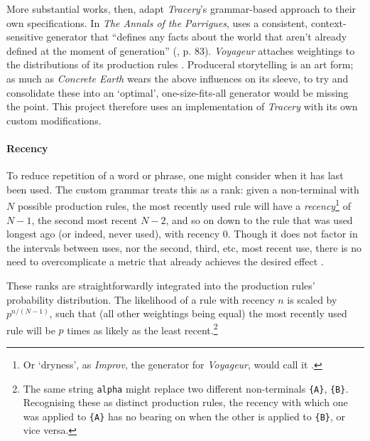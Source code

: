 \documentclass[a4paper, 11pt]{article}
\begin{document}
\begin{flushleft}
\vspace{5pt}\noindent
More substantial works, then, adapt \textit{Tracery}'s grammar-based approach to their own specifications. In \textit{The Annals of the Parrigues}, \citeauthor{shortParrigues} uses a consistent, context-sensitive generator that ``defines any facts about the world that aren’t already defined at the moment of generation'' (\citeyear{shortParrigues}, p. 83). \textit{Voyageur} \citep{diasVoyageur} attaches weightings to the distributions of its production rules \citep{diasVoyageurDescriptions}. Produceral storytelling is an art form; as much as \textit{Concrete Earth} wears the above influences on its sleeve, to try and consolidate these into an `optimal', one-size-fits-all generator would be missing the point. This project therefore uses an implementation of \textit{Tracery} with its own custom modifications.

\paragraph{Recency} To reduce repetition of a word or phrase, one might consider when it has last been used. The custom grammar treats this as a rank: given a non-terminal with $N$ possible production rules, the most recently used rule will have a \textit{recency}\footnote{Or `dryness', as \textit{Improv}, the generator for \textit{Voyageur}, would call it \citep{diasVoyageurDescriptions}.} of $N-1$, the second most recent $N-2$, and so on down to the rule that was used longest ago (or indeed, never used), with recency $0$. Though it does not factor in the intervals between uses, nor the second, third, etc, most recent use, there is no need to overcomplicate a metric that already achieves the desired effect \citep{kazemiSimpleProceduralGeneration}.

\vspace{5pt}\noindent
These ranks are straightforwardly integrated into the production rules' probability distribution. The likelihood of a rule with recency $n$ is scaled by $p^{n/(N-1)}$, such that (all other weightings being equal) the most recently used rule will be $p$ times as likely as the least recent.\footnote{The same string \texttt{alpha} might replace two different non-terminals \texttt{\{A\}}, \texttt{\{B\}}. Recognising these as distinct production rules, the recency with which one was applied to \texttt{\{A\}} has no bearing on when the other is applied to \texttt{\{B\}}, or vice versa.} 



\end{flushleft}
\end{document}
